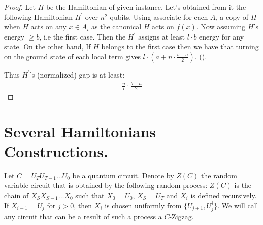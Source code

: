 \documentclass[manuscript,screen,review]{acmart}
\begin{document}
\begin{proof}
  Let $H$ be the Hamiltonian of given \CLASS instance. Let's obtained from it the following Hamiltonian $H^{\prime}$ over $n^{2}$ qubits. Using  associate for each $A_{i}$ a copy of $H$ when $H$ acts on any $x \in A_{i}$ as the canonical $H$ acts on $f(x)$. Now assuming $H$'s energy $\ge b$, i.e the first case. Then the $H^{\prime}$ assigns at least $l \cdot b $ energy for any state. On the other hand, If $H$ belongs to the first case then we have that turning on the ground state of each local term gives $l \cdot (a + n \cdot \frac{b-a}{2} )$. ().

  Thus $H^{\prime}$'s (normalized) gap is at least: 
  \begin{equation*}
    \begin{split}
      \frac{n}{l} \cdot \frac{b-a}{2}
    \end{split}
  \end{equation*}
\end{proof}


\section{Several Hamiltonians Constructions.}

\begin{definition} 
Let $C = U_{T}U_{T-1} \dots U_{0}$ be a quantum circuit. Denote by $Z(C)$ the random variable circuit that is obtained by the following random process: $Z(C)$ is the chain of $X_{S}X_{S-1} \dots X_{0}$ such that $X_{0}=U_{0}$, $X_{S}=U_{T}$ and $X_{i}$ is defined recursively. If $X_{i-1} = U_{j}$ for $j>0$, then $X_{i}$ is chosen uniformly from  $\{ U_{j+1}, U_{j}^{\dagger} \}$. We will call any circuit that can be a result of such a process a $C$-Zigzag.
\end{definition}
\end{document}
